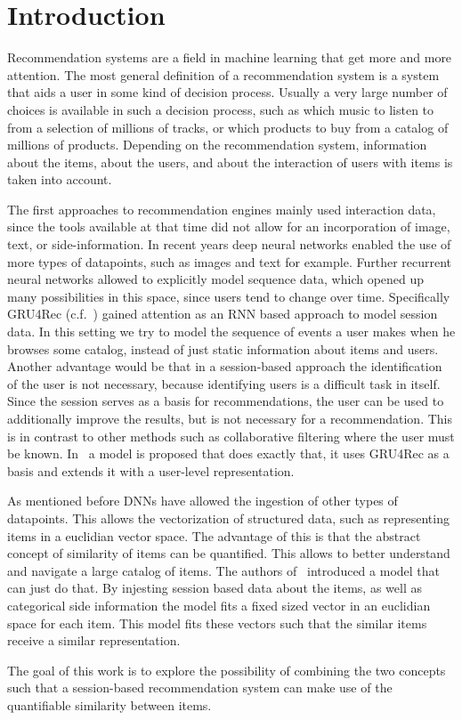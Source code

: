 \chapter{Introduction}
Recommendation systems are a field in machine learning that get more and more attention.
The most general definition of a recommendation system is a system that aids a user in some kind of decision process.
Usually a very large number of choices is available in such a decision process, such as which music to listen to from a selection of millions of tracks, or which products to buy from a catalog of millions of products.
Depending on the recommendation system, information about the items, about the users, and about the interaction of users with items is taken into account.
\par
The first approaches to recommendation engines mainly used interaction data, since the tools available at that time did not allow for an incorporation of image, text, or side-information.
In recent years deep neural networks enabled the use of more types of datapoints, such as images and text for example.
Further recurrent neural networks allowed to explicitly model sequence data, which opened up many possibilities in this space, since users tend to change over time.
Specifically GRU4Rec (c.f.~\cite{gru4rec}) gained attention as an RNN based approach to model session data.
In this setting we try to model the sequence of events a user makes when he browses some catalog, instead of just static information about items and users.
Another advantage would be that in a session-based approach the identification of the user is not necessary, because identifying users is a difficult task in itself.
Since the session serves as a basis for recommendations, the user can be used to additionally improve the results, but is not necessary for a recommendation.
This is in contrast to other methods such as collaborative filtering where the user must be known.
In~\cite{hierarchical} a model is proposed that does exactly that, it uses GRU4Rec as a basis and extends it with a user-level representation.
\par
As mentioned before DNNs have allowed the ingestion of other types of datapoints.
This allows the vectorization of structured data, such as representing items in a euclidian vector space.
The advantage of this is that the abstract concept of similarity of items can be quantified.
This allows to better understand and navigate a large catalog of items.
The authors of~\cite{meta_prod2vec} introduced a model that can just do that.
By injesting session based data about the items, as well as categorical side information the model fits a fixed sized vector in an euclidian space for each item.
This model fits these vectors such that the similar items receive a similar representation.
\par
The goal of this work is to explore the possibility of combining the two concepts such that a session-based recommendation system can make use of the quantifiable similarity between items.
